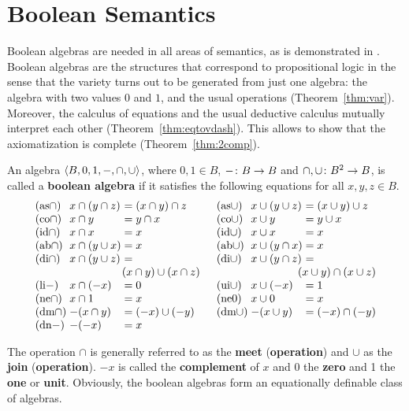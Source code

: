 \section{Boolean Semantics}
%
%
%
Boolean algebras are needed in all areas of semantics, as is 
demonstrated in \cite{keenanfaltz:boolean}. Boolean algebras 
are the structures that correspond to propositional logic 
in the sense that the variety turns out to be generated from 
just one algebra: the algebra with two values $0$ and $1$, 
and the usual operations (Theorem~\ref{thm:var}). 
Moreover, the calculus of equations and the usual deductive 
calculus mutually interpret each other (Theorem~\ref{thm:eqtovdash}). 
This allows to show that the axiomatization is complete 
(Theorem~\ref{thm:2comp}). 
\begin{defn}
\label{defn:ba}
An algebra $\langle B, 0, 1, -,\cap, \cup\rangle$, where $0, 1 \in B$, $-
\colon B \rightarrow B$ and $\cap, \cup \colon B^2 \rightarrow B$, is called a 
\textbf{boolean algebra} if it satisfies the following equations 
for all $x, y, z \in B$.
$$\begin{array}{l@{\;}l@{\; = \;}l@{\quad\quad}l@{\;}l@{\; = \;}l}
\mbox{\rm (as$\cap$)} & x \cap (y \cap z) &  
(x \cap y) \cap z &
    \mbox{\rm (as$\cup$)} & x \cup (y \cup z) 
    & (x \cup y) \cup z \\
\mbox{\rm (co$\cap$)} & x \cap y & y \cap x &
    \mbox{\rm (co$\cup$)} & x \cup y & y \cup x \\
\mbox{\rm (id$\cap$)} & x \cap x & x &
    \mbox{\rm (id$\cup$)} & x \cup x & x \\
\mbox{\rm (ab$\cap$)} & x \cap (y \cup x) & x &
    \mbox{\rm (ab$\cup$)} & x \cup (y \cap x) & x \\
\mbox{\rm (di$\cap$)} & x \cap (y \cup z) & &
    \mbox{\rm (di$\cup$)} & x \cup (y \cap z) & \\
& \multicolumn{2}{r}{(x \cap y) \cup (x \cap z)\quad} &
& \multicolumn{2}{r}{(x \cup y) \cap (x \cup z)} \\
\mbox{\rm (li$-$)} & x \cap (-x) & 0 &
    \mbox{\rm (ui$\cup$)} & x \cup (-x) & 1 \\
\mbox{\rm (ne$\cap$)} & x \cap 1 & x &
    \mbox{\rm (ne$0$)} & x \cup 0 & x \\
\mbox{\rm (dm$\cap$)} & -(x \cap y) & (-x) \cup (-y) &
    \mbox{\rm (dm$\cup$)} & -(x \cup y) & (-x) \cap (-y) \\
\mbox{\rm (dn$-$)} & -(- x) & x & \multicolumn{3}{c}{}
\end{array}$$
\end{defn}
The operation $\cap$ is generally referred to as the \textbf{meet}
(\textbf{operation}) and $\cup$ as the \textbf{join} 
(\textbf{operation}).  $- x$ is called the \textbf{complement} 
of $x$ and $0$ the \textbf{zero} 
and 1 the \textbf{one} or \textbf{unit}. 
Obviously, the boolean algebras 
form an equationally definable class of algebras.

